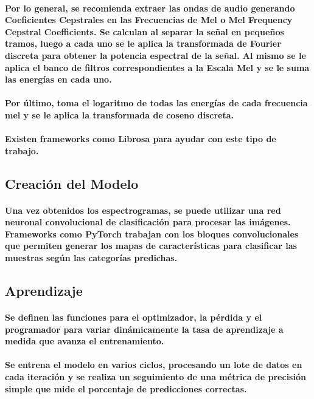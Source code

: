 \documentclass[a4paper,12pt]{article}
\begin{document}
\paragraph{Por lo general, se recomienda extraer las ondas de audio generando Coeﬁcientes Cepstrales en las Frecuencias de Mel o Mel Frequency Cepstral Coeﬃcients. Se calculan al separar la señal en pequeños tramos, luego a cada uno se le aplica la transformada de Fourier discreta para obtener la potencia espectral de la señal. Al mismo se le aplica el banco de filtros correspondientes a la Escala Mel y se le suma las energías en cada uno.}
\paragraph{Por último, toma el logaritmo de todas las energías de cada frecuencia mel y se le aplica la transformada de coseno discreta.}
\paragraph{Existen frameworks como Librosa para ayudar con este tipo de trabajo.}
\subsection{Creación del Modelo}
\paragraph{Una vez obtenidos los espectrogramas, se puede utilizar una red neuronal convolucional de clasificación para procesar las imágenes. Frameworks como PyTorch trabajan con los bloques convolucionales que permiten generar los mapas de características para clasificar las muestras según las categorías predichas.}
\subsection{Aprendizaje}
\paragraph{Se definen las funciones para el optimizador, la pérdida y el programador para variar dinámicamente la tasa de aprendizaje a medida que avanza el entrenamiento.}
\paragraph{Se entrena el modelo en varios ciclos, procesando un lote de datos en cada iteración y se realiza un seguimiento de una métrica de precisión simple que mide el porcentaje de predicciones correctas.}
\end{document}
